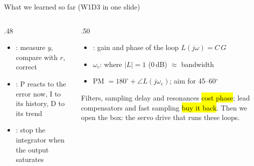 \documentclass[aspectratio=169,10pt]{beamer}
\newcommand{\sumsym}{\scalebox{.7}{$\Sigma$}}
\begin{document}
\begin{frame}{What we learned so far (W1D3 in one slide)}
\begin{columns}[T]
\begin{column}{.48\textwidth}
\centering
{}

\vspace{1mm}
\small
\begin{itemize}\setlength\itemsep{.4mm}
\item {}: measure $y$, compare with $r$, correct
\item {}: P reacts to the error now, I to its history, D to its trend
\item {}: stop the integrator when the output saturates
\end{itemize}
\end{column}
\begin{column}{.50\textwidth}
\small
\begin{itemize}\setlength\itemsep{.4mm}
\item {}: gain and phase of the loop $L(j\omega)=C\,G$
\item {} $\omega_c$: where $|L|=1$ (0\,dB) $\approx$ bandwidth
\item {} PM $=180^\circ+\angle L(j\omega_c)$; aim for 45--60$^\circ$
\end{itemize}
\begin{keybox}
Filters, sampling delay and resonances \hl{cost phase}; lead compensators and fast sampling \hl{buy it back}. Then we open the box: the servo drive that runs these loops.
\end{keybox}
\end{column}
\end{columns}
\end{frame}
\end{document}
